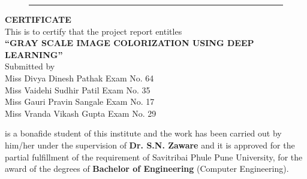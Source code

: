 \documentclass[12pt]{report}	%
\begin{document}
	\begin{titlepage} 
	
		\begin{center} 
\vspace{0.2in}
		\begin{figure}[h]
				\centerline{}
\par\noindent\rule{\textwidth}{0.4pt}
			\end{figure}
		\end{center}
		\begin{center}
		{\large\textbf{CERTIFICATE}}\\
		{\small This is to certify that the project report entitles \\
			{\bf \large {``GRAY SCALE IMAGE COLORIZATION USING DEEP LEARNING''}}\\ Submitted by \\ 	
			{\small  Miss Divya Dinesh Pathak \hspace*{1.9 in} Exam No. 64 \\Miss Vaidehi Sudhir Patil \hspace*{1.9 in} Exam No. 35 \\Miss Gauri Pravin Sangale\hspace*{1.9 in} Exam No. 17  \\Miss Vranda Vikash Gupta\hspace*{1.9 in} Exam No. 29 }
		}
	\end{center}
			{
			is a bonafide student of this institute and the work has been carried out by him/her under the supervision of {\bf Dr. S.N. Zaware } and it is approved for the partial fulfillment of the requirement of Savitribai Phule Pune University, for the award of the degrees of {\bf Bachelor of Engineering} (Computer Engineering). }\\
		

\end{titlepage}
\end{document}
